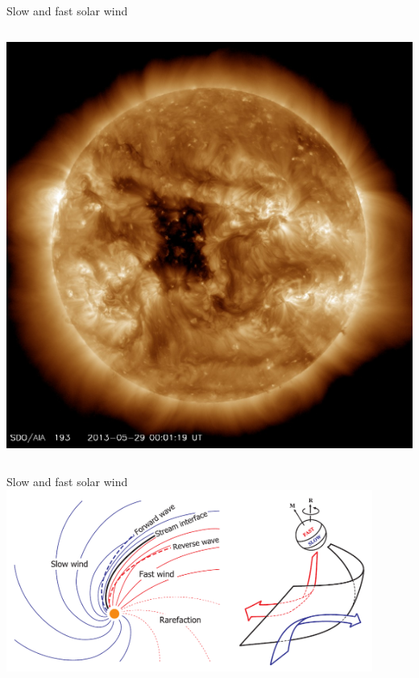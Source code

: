 \begin{frame}[plain,c]{Slow and fast solar wind}{}
	\begin{columns}[c]

	\includegraphics[width=\textwidth]{../figures_of_others/images/20130529_000119_1024_0193.jpg}
	
	
	\end{columns}
\end{frame}
\begin{frame}[plain,c]{Slow and fast solar wind}{}
	\centering
	\includegraphics[width=0.9\textwidth]{../figures_of_others/images/Owens2013_CIR_2panel_screenshot.png}
\end{frame}


